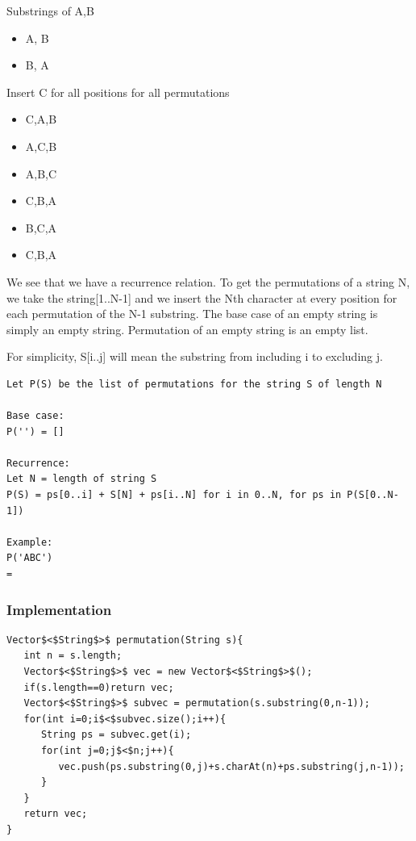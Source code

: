 \documentclass[11pt,oneside]{book}
\begin{document}
Substrings of A,B

\begin{itemize}
\item A, B
\item B, A
\end{itemize}

Insert C for all positions for all permutations

\begin{itemize}
\item C,A,B
\item A,C,B
\item A,B,C
\item C,B,A
\item B,C,A
\item C,B,A
\end{itemize}

We see that we have a recurrence relation. To get the permutations of a string N, we take the string[1..N-1] and we insert the Nth character at every position for each permutation of the N-1 substring. The base case of an empty string is simply an empty string. Permutation of an empty string is an empty list.

For simplicity, S[i..j] will mean the substring from including i to excluding j.

\begin{lstlisting}
Let P(S) be the list of permutations for the string S of length N

Base case:
P('') = []

Recurrence:
Let N = length of string S
P(S) = ps[0..i] + S[N] + ps[i..N] for i in 0..N, for ps in P(S[0..N-1])

Example:
P('ABC')
=

\end{lstlisting}

\subsubsection{Implementation}

\begin{lstlisting}
Vector$<$String$>$ permutation(String s){
   int n = s.length;
   Vector$<$String$>$ vec = new Vector$<$String$>$();
   if(s.length==0)return vec;
   Vector$<$String$>$ subvec = permutation(s.substring(0,n-1));
   for(int i=0;i$<$subvec.size();i++){
      String ps = subvec.get(i);
      for(int j=0;j$<$n;j++){
         vec.push(ps.substring(0,j)+s.charAt(n)+ps.substring(j,n-1));
      }
   }
   return vec;
}
\end{lstlisting}
\end{document}
